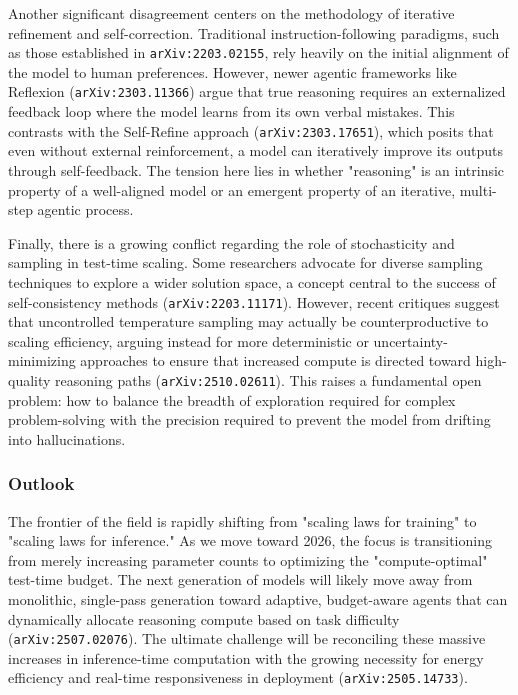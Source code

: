 \documentclass[11pt]{article}
\begin{document}
Another significant disagreement centers on the methodology of iterative refinement and self-correction. Traditional instruction-following paradigms, such as those established in \texttt{arXiv:2203.02155}, rely heavily on the initial alignment of the model to human preferences. However, newer agentic frameworks like Reflexion (\texttt{arXiv:2303.11366}) argue that true reasoning requires an externalized feedback loop where the model learns from its own verbal mistakes. This contrasts with the Self-Refine approach (\texttt{arXiv:2303.17651}), which posits that even without external reinforcement, a model can iteratively improve its outputs through self-feedback. The tension here lies in whether "reasoning" is an intrinsic property of a well-aligned model or an emergent property of an iterative, multi-step agentic process.

Finally, there is a growing conflict regarding the role of stochasticity and sampling in test-time scaling. Some researchers advocate for diverse sampling techniques to explore a wider solution space, a concept central to the success of self-consistency methods (\texttt{arXiv:2203.11171}). However, recent critiques suggest that uncontrolled temperature sampling may actually be counterproductive to scaling efficiency, arguing instead for more deterministic or uncertainty-minimizing approaches to ensure that increased compute is directed toward high-quality reasoning paths (\texttt{arXiv:2510.02611}). This raises a fundamental open problem: how to balance the breadth of exploration required for complex problem-solving with the precision required to prevent the model from drifting into hallucinations.

\subsubsection{Outlook}

The frontier of the field is rapidly shifting from "scaling laws for training" to "scaling laws for inference." As we move toward 2026, the focus is transitioning from merely increasing parameter counts to optimizing the "compute-optimal" test-time budget. The next generation of models will likely move away from monolithic, single-pass generation toward adaptive, budget-aware agents that can dynamically allocate reasoning compute based on task difficulty (\texttt{arXiv:2507.02076}). The ultimate challenge will be reconciling these massive increases in inference-time computation with the growing necessity for energy efficiency and real-time responsiveness in deployment (\texttt{arXiv:2505.14733}).
\end{document}
